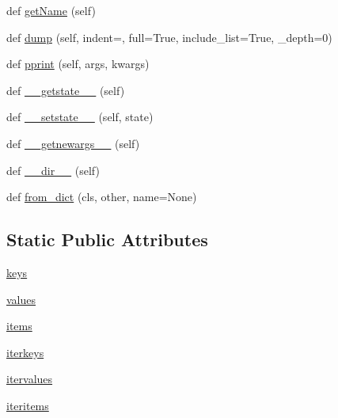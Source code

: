 \begin{DoxyCompactItemize}
\item 
def \hyperlink{classpyparsing_1_1ParseResults_a03785d4d1f24e581c4fdc8607faebfa5}{get\+Name} (self)
\item 
def \hyperlink{classpyparsing_1_1ParseResults_abe6f1c3c8271ce11c6098f7564920327}{dump} (self, indent=\textquotesingle{}\textquotesingle{}, full=True, include\+\_\+list=True, \+\_\+depth=0)
\item 
def \hyperlink{classpyparsing_1_1ParseResults_af7156d4707a1e2388831839e12ec6305}{pprint} (self, args, kwargs)
\item 
def \hyperlink{classpyparsing_1_1ParseResults_aee2584b108c55167907d5099a58bbffc}{\+\_\+\+\_\+getstate\+\_\+\+\_\+} (self)
\item 
def \hyperlink{classpyparsing_1_1ParseResults_aecc83b13f104ed7eea25c07071bf4a51}{\+\_\+\+\_\+setstate\+\_\+\+\_\+} (self, state)
\item 
def \hyperlink{classpyparsing_1_1ParseResults_aada48eb22d17171727ddd64456ad9454}{\+\_\+\+\_\+getnewargs\+\_\+\+\_\+} (self)
\item 
def \hyperlink{classpyparsing_1_1ParseResults_a976b97c2526a7593c1b4af4b1eaa84dd}{\+\_\+\+\_\+dir\+\_\+\+\_\+} (self)
\item 
def \hyperlink{classpyparsing_1_1ParseResults_a91bfb3141d44ced70928e7ca17bcc5fd}{from\+\_\+dict} (cls, other, name=None)
\end{DoxyCompactItemize}
\subsection*{Static Public Attributes}
\begin{DoxyCompactItemize}
\item 
\hyperlink{classpyparsing_1_1ParseResults_a04137602118c141a59d34a6b2cc5d104}{keys}
\item 
\hyperlink{classpyparsing_1_1ParseResults_a19f1847e3d7b1d2f464e04f1d38e5f0d}{values}
\item 
\hyperlink{classpyparsing_1_1ParseResults_a7b4ae7f3bd464b8be79308599a11544d}{items}
\item 
\hyperlink{classpyparsing_1_1ParseResults_a12fcc2311888c2fdb820b049d8e37ee1}{iterkeys}
\item 
\hyperlink{classpyparsing_1_1ParseResults_ab4f8054a8874468b6420b12948177bbf}{itervalues}
\item 
\hyperlink{classpyparsing_1_1ParseResults_afd0d4e70752ff3684ea68364762dccf8}{iteritems}
\end{DoxyCompactItemize}


